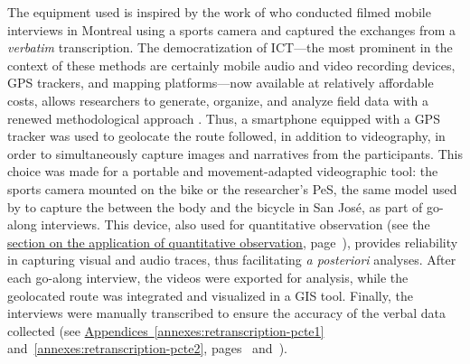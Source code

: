 \begin{refsegment}
The equipment used is inspired by the work of \textcolor{blue}{\textcite[14]{despres_replacer_2019}} who conducted filmed mobile interviews in Montreal using a sports camera and captured the exchanges from a \textsl{verbatim} transcription. The democratization of \acrfull{ICT}—the most prominent in the context of these  methods are certainly mobile audio and video recording devices, GPS trackers, and mapping platforms—now available at relatively affordable costs, allows researchers to generate, organize, and analyze field data with a renewed methodological approach \textcolor{blue}{\autocites[1271]{hein_mobile_2008}[120]{bergeron_uncovering_2014}}. Thus, a smartphone equipped with a \acrshort{GPS} tracker was used to geolocate the route followed, in addition to videography, in order to simultaneously capture images and narratives from the participants. This choice was made for a portable and movement-adapted videographic tool: the  sports camera mounted on the bike or the researcher’s \acrshort{PeS}, the same model used by \textcolor{blue}{\textcite[166]{chin_keep_2020}} to capture the  between the body and the bicycle in San José, as part of go-along interviews. This device, also used for quantitative observation (see the \hyperref[chap3:application-observation-quantitative]{section on the application of quantitative observation}, page~\pageref{chap3:application-observation-quantitative}), provides reliability in capturing visual and audio traces, thus facilitating \textsl{a posteriori} analyses. After each go-along interview, the videos were exported for analysis, while the geolocated route was integrated and visualized in a \acrshort{GIS} tool. Finally, the interviews were manually transcribed to ensure the accuracy of the verbal data collected (see \hyperref[annexes:retranscription-pcte1]{Appendices~\ref{annexes:retranscription-pcte1}} and~\ref{annexes:retranscription-pcte2}, pages~\pageref{annexes:retranscription-pcte1} and~\pageref{annexes:retranscription-pcte2}).%


\end{refsegment}
